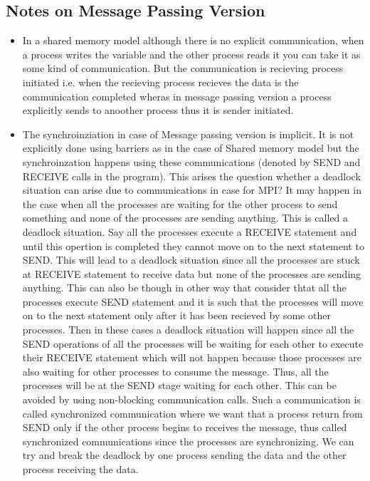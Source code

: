 \documentclass[12pt]{article}
\begin{document}
\subsection{Notes on Message Passing Version}
\begin{itemize}
    \item In a shared memory model although there is no explicit communication,
    when a process writes the variable and the other process reads it you can take it as some kind of communication. But the communication 
    is recieving process initiated i.e. when the recieving process recieves the data is the communication completed wheras in message passing version
    a process explicitly sends to anoother process thus it is sender initiated. 
    \item The synchroinziation in case of Message passing version is implicit. It is not explicitly done using barriers as in the case of Shared memory model
    but the synchroinzation happens using these communications (denoted by SEND and RECEIVE calls in the program).
    This arises the question whether a deadlock situation can arise due to communications in case for MPI? It may happen in the case when all the processes are waiting for the other process to send something 
    and none of the processes are sending anything. This is called a deadlock situation. Say all the processes execute a RECEIVE statement and until this opertion is completed they cannot move on to the next statement to SEND.
    This will lead to a deadlock situation since all the processes are stuck at RECEIVE statement to receive data but none of the processes are sending anything. This can also be though in other way that consider thtat all the processes execute SEND statement
    and it is such that the processes will move on to the next statement only after it has been recieved by some other processes. Then in these cases a deadlock situation will happen since all the SEND operations of all the processes will be waiting for each other 
    to execute their RECEIVE statement which will not happen because those processes are also waiting for other processes to consume the message. Thus, all the processes will be at the SEND stage waiting for each other.
    This can be avoided by using non-blocking communication calls. Such a communication is called synchronized communication where we want that a process return from SEND only if the other process begins to receives the message, thus called synchronized communications since the 
    processes are synchronizing. We can try and break the deadlock by one process sending the data and the other process receiving the data.

\end{itemize}
\end{document}
